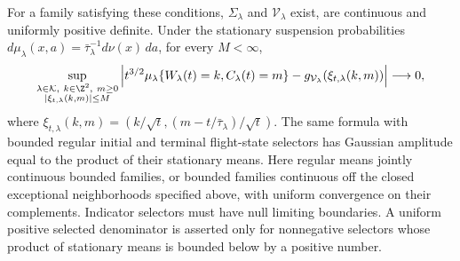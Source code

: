 \begin{theorem}
\label{thm:v35-action-family-LLT}
For a family satisfying these conditions, $\Sigma_\lambda$ and
$\mathcal V_\lambda$ exist, are continuous and uniformly positive
definite. Under the stationary suspension probabilities
$d\mu_\lambda(x,a)=\bar\tau_\lambda^{-1}d\nu(x)\,da$, for every
$M<\infty$,
\begin{equation}\label{eq:v35-family-singleton}
 \sup_{\substack{\lambda\in\mathcal K,\ k\in\Z^2,\ m\ge0\\
                 |\xi_{t,\lambda}(k,m)|\le M}}
 \left|t^{3/2}\mu_\lambda\{W_\lambda(t)=k,C_\lambda(t)=m\}
                 -g_{\mathcal V_\lambda}(\xi_{t,\lambda}(k,m))\right|
                       \longrightarrow0,
\end{equation}
where $\xi_{t,\lambda}(k,m)=(k/\sqrt t,
(m-t/\bar\tau_\lambda)/\sqrt t)$.
The same formula with bounded regular initial and terminal flight-state
selectors has Gaussian amplitude equal to the product of their
stationary means. Here regular means jointly continuous bounded
families, or bounded families continuous off the closed exceptional
neighborhoods specified above, with uniform convergence on their
complements. Indicator selectors must have null limiting boundaries.
A uniform positive selected denominator is asserted only for
nonnegative selectors whose product of stationary means is bounded
below by a positive number.
\end{theorem}

